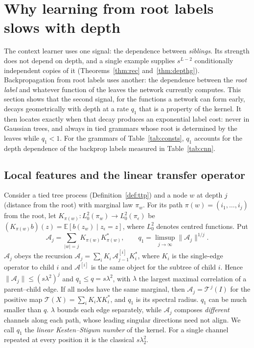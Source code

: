 \documentclass[11pt]{article}
\theoremstyle{definition}
\newcommand{\E}{\mathbb{E}}
\newcommand{\norm}[1]{\lVert #1\rVert}
\begin{document}
\section{Why learning from root labels slows with depth}\label{sec:claim2}
The context learner uses one signal: the dependence between \emph{siblings}. Its strength does
not depend on depth, and a single example supplies $s^{L-2}$ conditionally independent copies of it
(Theorems~\ref{thm:rec} and~\ref{thm:depthg}). Backpropagation from root labels uses another: the
dependence between the \emph{root label} and whatever function of the leaves the network currently
computes. This section shows that the second signal, for the functions a network can form early,
decays geometrically with depth at a rate $q_1$ that is a property of the kernel. It then locates
exactly when that decay produces an exponential label cost: never in Gaussian trees, and always in
tied grammars whose root is determined by the leaves while $q_1<1$. For the grammars of
Table~\ref{tab:consts}, $q_1$ accounts for the depth dependence of the backprop labels measured in
Table~\ref{tab:cnn}.

\subsection{Local features and the linear transfer operator}
Consider a tied tree process (Definition~\ref{def:ttp}) and a node $w$ at depth $j$ (distance from
the root) with marginal law $\pi_w$. For its path $\pi(w)=(i_1,\dots,i_j)$ from the root, let
$K_{\pi(w)}:L^2_0(\pi_w)\to L^2_0(\pi_\epsilon)$ be $(K_{\pi(w)}b)(z)=\E[b(z_w)\mid z_\epsilon=z]$, where
$L^2_0$ denotes centred functions. Put
\[
\mathcal A_j=\sum_{|w|=j}K_{\pi(w)}K_{\pi(w)}^{*},\qquad
q_1=\limsup_{j\to\infty}\norm{\mathcal A_j}^{1/j}.
\]
$\mathcal A_j$ obeys the recursion $\mathcal A_j=\sum_iK_i\,\mathcal A^{[i]}_{j-1}K_i^{*}$, where $K_i$ is the
single-edge operator to child $i$ and $\mathcal A^{[i]}$ is the same object for the subtree of child
$i$. Hence $\norm{\mathcal A_j}\le(s\lambda^2)^j$ and $q_1\le q=s\lambda^2$, with $\lambda$ the largest
maximal correlation of a parent--child edge. If all nodes have the same marginal, then
$\mathcal A_j=\mathcal T^{\,j}(I)$ for the positive map $\mathcal T(X)=\sum_iK_iXK_i^{*}$, and $q_1$ is its
spectral radius. $q_1$ can be much smaller than $q$. $\lambda$ bounds each edge separately, while
$\mathcal A_j$ composes \emph{different} channels along each path, whose leading singular directions need
not align. We call $q_1$ the \emph{linear Kesten--Stigum number} of the kernel. For a single channel
repeated at every position it is the classical $s\lambda_2^2$.
\end{document}
